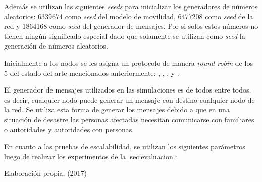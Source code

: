 Además se utilizan las siguientes \textit{seeds} para inicializar los
generadores de números aleatorios: 6339674 como \textit{seed} del modelo de
movilidad, 6477208 como \textit{seed} de la red y 1864168 como \textit{seed} del
generador de mensajes. Por si solos estos números no tienen ningún significado
especial dado que solamente se utilizan como \textit{seed} la generación de
números aleatorios.


Inicialmente a los nodos se les asigna un protocolo de manera
\textit{round-robin} de los 5 del estado del arte mencionados anteriormente:
\maxprop, \syw, \syf, \prophet{} y \epidemic.


El generador de mensajes utilizados en las simulaciones es de todos entre todos,
es decir, cualquier nodo puede generar un mensaje con destino cualquier nodo de
la red. Se utiliza esta forma de generar los mensajes debido a que en una
situación de desastre las personas afectadas necesitan comunicarse con
familiares o autoridades y autoridades con personas.


En cuanto a las pruebas de escalabilidad, se utilizan los siguientes parámetros
luego de realizar los experimentos de la \ref{sec:evaluacion}:



{Elaboración propia, (2017)}


